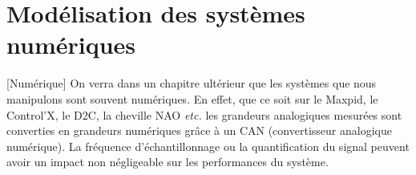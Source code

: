 \section{Modélisation des systèmes numériques}[Numérique]
On verra dans un chapitre ultérieur que les systèmes que nous manipulons sont souvent numériques. En effet, que ce soit sur le Maxpid, le Control'X, le D2C, la cheville NAO \textit{etc.} les grandeurs analogiques mesurées sont converties en grandeurs numériques grâce à un CAN (convertisseur analogique numérique). La fréquence d'échantillonnage ou la quantification du signal peuvent avoir un impact non négligeable sur les performances du système.



%


